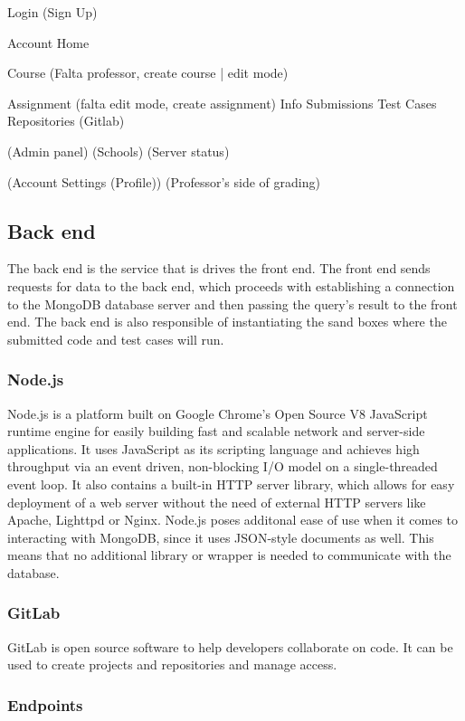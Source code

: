 Login
(Sign Up)

Account Home

Course (Falta professor, create course | edit mode)

Assignment (falta edit mode, create assignment)
	Info
	Submissions
	Test Cases
	Repositories (Gitlab)

(Admin panel)
	(Schools)
	(Server status)

(Account Settings (Profile))
(Professor's side of grading)


\subsection{Back end}
The back end is the service that is drives the front end. The front end sends
requests for data to the back end, which proceeds with establishing a
connection to the MongoDB database server and then passing the query's result
to the front end. The back end is also responsible of instantiating the sand
boxes where the submitted code and test cases will run.

\subsubsection{Node.js}

Node.js is a platform built on Google Chrome's Open Source V8 JavaScript runtime
engine for easily building fast and scalable network and server-side
applications. It uses JavaScript as its scripting language and achieves high
throughput via an event driven, non-blocking I/O model on a single-threaded
event loop. It also contains a built-in HTTP server library, which allows for
easy deployment of a web server without the need of external HTTP servers like
Apache, Lighttpd or Nginx. Node.js poses additonal ease of use when it comes to
interacting with MongoDB, since it uses JSON-style documents as well. This means
that no additional library or wrapper is needed to communicate with the
database.

\subsubsection{GitLab}
GitLab is open source software to help developers collaborate on code. It can
be used to create projects and repositories and manage access.

\subsubsection{Endpoints}

